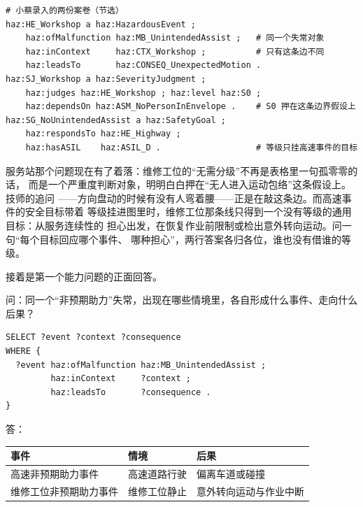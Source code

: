 \nopagebreak[4]
\begin{codebox}
\begin{Verbatim}[fontsize=\small,breaklines=true,breakanywhere=true,breaksymbolleft={},breaksymbolright={}]
# 小蔡录入的两份案卷（节选）
haz:HE_Workshop a haz:HazardousEvent ;
    haz:ofMalfunction haz:MB_UnintendedAssist ;   # 同一个失常对象
    haz:inContext     haz:CTX_Workshop ;          # 只有这条边不同
    haz:leadsTo       haz:CONSEQ_UnexpectedMotion .
haz:SJ_Workshop a haz:SeverityJudgment ;
    haz:judges haz:HE_Workshop ; haz:level haz:S0 ;
    haz:dependsOn haz:ASM_NoPersonInEnvelope .    # S0 押在这条边界假设上
haz:SG_NoUnintendedAssist a haz:SafetyGoal ;
    haz:respondsTo haz:HE_Highway ;
    haz:hasASIL    haz:ASIL_D .                   # 等级只挂高速事件的目标
\end{Verbatim}
\end{codebox}

服务站那个问题现在有了着落：维修工位的“无需分级”不再是表格里一句孤零零的话，
而是一个严重度判断对象，明明白白押在“无人进入运动包络”这条假设上。技师的追问
——方向盘动的时候有没有人弯着腰——正是在敲这条边。而高速事件的安全目标带着
等级挂进图里时，维修工位那条线只得到一个没有等级的通用目标：从服务连续性的
担心出发，在恢复作业前限制或检出意外转向运动。问一句“每个目标回应哪个事件、
哪种担心”，两行答案各归各位，谁也没有借谁的等级。

接着是第一个能力问题的正面回答。

问：同一个“非预期助力”失常，出现在哪些情境里，各自形成什么事件、走向什么后果？

\nopagebreak[4]
\begin{codebox}
\begin{Verbatim}[fontsize=\small,breaklines=true,breakanywhere=true,breaksymbolleft={},breaksymbolright={}]
SELECT ?event ?context ?consequence
WHERE {
  ?event haz:ofMalfunction haz:MB_UnintendedAssist ;
         haz:inContext     ?context ;
         haz:leadsTo       ?consequence .
}
\end{Verbatim}
\end{codebox}

答：

\begin{center}
\begingroup\small
\setlength{\tabcolsep}{4pt}
\begin{tabularx}{\linewidth}{@{}XXX@{}}
\toprule
事件 & 情境 & 后果 \\
\midrule
高速非预期助力事件 & 高速道路行驶 & 偏离车道或碰撞 \\
维修工位非预期助力事件 & 维修工位静止 & 意外转向运动与作业中断 \\
\bottomrule
\end{tabularx}
\endgroup
\end{center}

